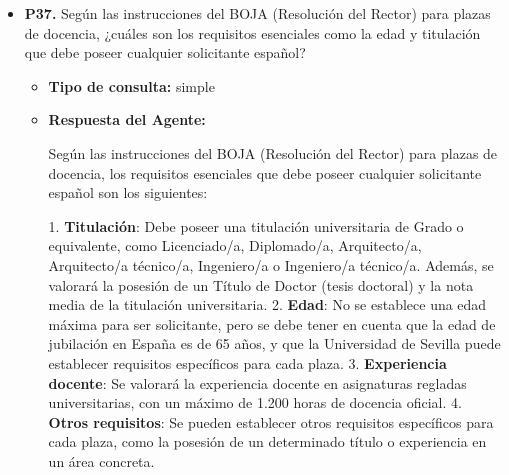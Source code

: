 \documentclass{article}
\begin{document}
\begin{itemize}
\begin{itemize}
                        En resumen, aunque no se especifican explícitamente los motivos para la concesión de un aplazamiento excepcional en el pago de tasas, se establecen las condiciones generales para el pago de las matrículas y los supuestos en los que no se puede fraccionar el pago, así como los procedimientos y efectos de la anulación de matrícula. Es posible que la Universidad de Sevilla tenga procedimientos internos para considerar solicitudes de aplazamiento excepcional en el pago de tasas, pero estos no se especifican en el Reglamento y Normas de Matrícula proporcionado.
                  \item \textbf{Contexto utilizado:}

            \end{itemize}

      \item \textbf{P37.} Según las instrucciones del BOJA (Resolución del Rector) para plazas de docencia, ¿cuáles son los requisitos esenciales como la edad y titulación que debe poseer cualquier solicitante español? \\
            \begin{itemize}
                  \item \textbf{Tipo de consulta:} simple
                  \item \textbf{Respuesta del Agente:}

                        Según las instrucciones del BOJA (Resolución del Rector) para plazas de docencia, los requisitos esenciales que debe poseer cualquier solicitante español son los siguientes:

                        1. \textbf{Titulación}: Debe poseer una titulación universitaria de Grado o equivalente, como Licenciado/a, Diplomado/a, Arquitecto/a, Arquitecto/a técnico/a, Ingeniero/a o Ingeniero/a técnico/a. Además, se valorará la posesión de un Título de Doctor (tesis doctoral) y la nota media de la titulación universitaria.
                        2. \textbf{Edad}: No se establece una edad máxima para ser solicitante, pero se debe tener en cuenta que la edad de jubilación en España es de 65 años, y que la Universidad de Sevilla puede establecer requisitos específicos para cada plaza.
                        3. \textbf{Experiencia docente}: Se valorará la experiencia docente en asignaturas regladas universitarias, con un máximo de 1.200 horas de docencia oficial.
                        4. \textbf{Otros requisitos}: Se pueden establecer otros requisitos específicos para cada plaza, como la posesión de un determinado título o experiencia en un área concreta.


\end{itemize}
\end{itemize}
\end{document}
